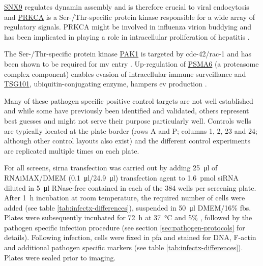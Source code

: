 \begin{description}[leftmargin=0.5cm]
\item[Adenovirus\slash rhinovirus:] \hyperlink{tab:control-snx9}{SNX9} regulates dynamin assembly and is therefore crucial to viral endocytosis and \hyperlink{tab:control-prkca}{PRKCA} is a Ser-\slash Thr-specific protein kinase responsible for a wide array of regulatory signals. PRKCA might be involved in influenza virion buddying and has been implicated in playing a role in intracellular proliferation of hepatitis \citep{Kanehisa2000}.
\item[Vaccinia virus:] The Ser-\slash Thr-specific protein kinase \hyperlink{tab:control-pak1}{PAK1} is targeted by \gls{cdc-42}\slash \gls{rac-1} and has been shown to be required for \gls{mv} entry \citep{Mercer2008}. Up-regulation of \hyperlink{tab:control-psma6}{PSMA6} (a proteasome complex component) enables evasion of intracellular immune surveillance \citep{Zhou2014} and \hyperlink{tab:control-tsg101}{TSG101}, ubiquitin-conjugating enzyme, hampers \gls{ev} production \citep{Honeychurch2007}. 
\end{description}

Many of these pathogen specific positive control targets are not well established and while some have previously been identified and validated, others represent best guesses and might not serve their purpose particularly well. Controls wells are typically located at the plate border (rows A and P; columns 1, 2, 23 and 24; although other control layouts also exist) and the different control experiments are replicated multiple times on each plate.

For all screens, \gls{sirna} transfection was carried out by adding \SI{25}{\micro\litre} of RNAi\-MAX\slash DMEM (\SI{0.1}{\micro\litre}\slash \SI{24.9}{\micro\litre}) transfection agent to \SI{1.6}{\pico\mol} siRNA diluted in \SI{5}{\micro\litre} RNase-free  contained in each of the 384 wells per screening plate. After \SI{1}{\hour} incubation at room temperature, the required number of cells were added (see table \ref{tab:infectx-differences}), suspended in \SI{50}{\micro\litre} DMEM\slash 16\% \gls{fbs}. Plates were subsequently incubated for \SI{72}{\hour} at \SI{37}{\celsius} and 5\% , followed by the pathogen specific infection procedure (see section \ref{sec:pathogen-protocols} for details). Following infection, cells were fixed in \gls{pfa} and stained for DNA, F-actin and additional pathogen specific markers (see table \ref{tab:infectx-differences}). Plates were sealed prior to imaging.

